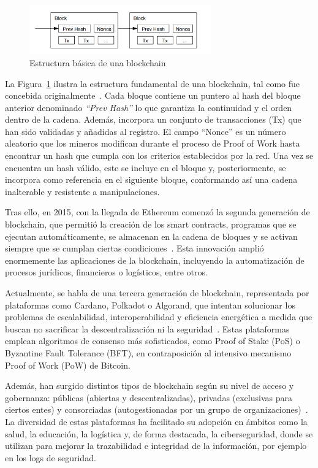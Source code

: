 \begin{figure}[h!]
\centering
\includegraphics[width=0.7\textwidth]{figuras/blockchain.png} 
\caption{Estructura básica de una blockchain \cite{nakamoto2008bitcoin}}
\label{fig:blockchain_estructura}
\end{figure}
La Figura~\ref{fig:blockchain_estructura} ilustra la estructura fundamental de una blockchain, tal como fue concebida originalmente~\cite{nakamoto2008bitcoin}. Cada bloque contiene un puntero al hash del bloque anterior denominado \textit{“Prev Hash”} lo que garantiza la continuidad y el orden dentro de la cadena. Además, incorpora un conjunto de transacciones (Tx) que han sido validadas y añadidas al registro. El campo “Nonce” es un número aleatorio que los mineros modifican durante el proceso de Proof of Work hasta encontrar un hash que cumpla con los criterios establecidos por la red. Una vez se encuentra un hash válido, este se incluye en el bloque y, posteriormente, se incorpora como referencia en el siguiente bloque, conformando así una cadena inalterable y resistente a manipulaciones.

Tras ello, en 2015, con la llegada de Ethereum comenzó la segunda generación de blockchain, que permitió la creación de los smart contracts, programas que se ejecutan automáticamente, se almacenan en la cadena de bloques y se activan siempre que se cumplan ciertas condiciones~\cite{Buterin2014}. Esta innovación amplió enormemente las aplicaciones de la blockchain, incluyendo la automatización de procesos jurídicos, financieros o logísticos, entre otros.

Actualmente, se habla de una tercera generación de blockchain, representada por plataformas como Cardano, Polkadot o Algorand, que intentan solucionar los problemas de escalabilidad, interoperabilidad y eficiencia energética a medida que buscan no sacrificar la descentralización ni la seguridad~\cite{Swan2015}. Estas plataformas emplean algoritmos de consenso más sofisticados, como Proof of Stake (PoS) o Byzantine Fault Tolerance (BFT), en contraposición al intensivo mecanismo Proof of Work (PoW) de Bitcoin.

Además, han surgido distintos tipos de blockchain según su nivel de acceso y gobernanza: públicas (abiertas y descentralizadas), privadas (exclusivas para ciertos entes) y consorciadas (autogestionadas por un grupo de organizaciones)~\cite{Xu2017}. La diversidad de estas plataformas ha facilitado su adopción en ámbitos como la salud, la educación, la logística y, de forma destacada, la ciberseguridad, donde se utilizan para mejorar la trazabilidad e integridad de la información, por ejemplo en los logs de seguridad.

